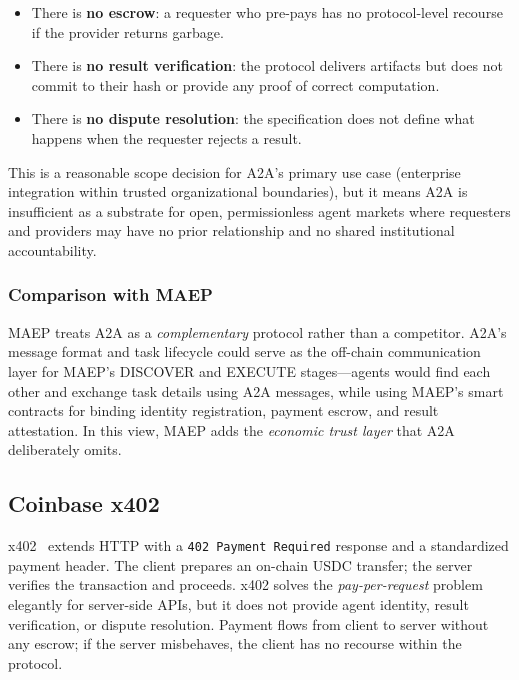 \documentclass[conference]{IEEEtran}
\begin{document}
\begin{itemize}
  \item There is \textbf{no escrow}: a requester who pre-pays has no
    protocol-level recourse if the provider returns garbage.
  \item There is \textbf{no result verification}: the protocol
    delivers artifacts but does not commit to their hash or provide
    any proof of correct computation.
  \item There is \textbf{no dispute resolution}: the specification does
    not define what happens when the requester rejects a result.
\end{itemize}

This is a reasonable scope decision for A2A's primary use case
(enterprise integration within trusted organizational boundaries), but
it means A2A is insufficient as a substrate for open, permissionless
agent markets where requesters and providers may have no prior
relationship and no shared institutional accountability.

\subsubsection{Comparison with MAEP}

MAEP treats A2A as a \emph{complementary} protocol rather than a
competitor.  A2A's message format and task lifecycle could serve as
the off-chain communication layer for MAEP's DISCOVER and EXECUTE
stages---agents would find each other and exchange task details using
A2A messages, while using MAEP's smart contracts for binding identity
registration, payment escrow, and result attestation.  In this view,
MAEP adds the \emph{economic trust layer} that A2A deliberately omits.

\subsection{Coinbase x402}

x402~\cite{x402} extends HTTP with a \texttt{402 Payment Required}
response and a standardized payment header.  The client prepares an
on-chain USDC transfer; the server verifies the transaction and
proceeds.  x402 solves the \emph{pay-per-request} problem elegantly
for server-side APIs, but it does not provide agent identity, result
verification, or dispute resolution.  Payment flows from client to
server without any escrow; if the server misbehaves, the client has no
recourse within the protocol.
\end{document}
